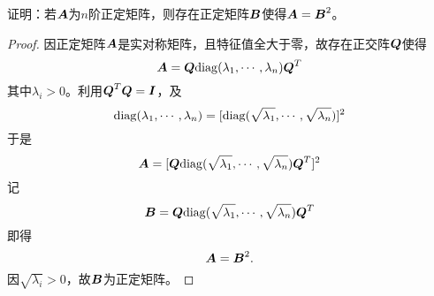\begin{frame}
  \begin{li}
    证明：若$\boldsymbol{A}$为$n$阶正定矩阵，则存在正定矩阵$\boldsymbol{B}$使得$\boldsymbol{A}=\boldsymbol{B}^2$。
  \end{li}

  \begin{proof}
    因正定矩阵$\boldsymbol{A}$是实对称矩阵，且特征值全大于零，故存在正交阵$\boldsymbol{Q}$使得
    $$
    \boldsymbol{A}=\boldsymbol{Q}\mathrm{diag}(\lambda_1,\cdots,\lambda_n)\boldsymbol{Q}^T
    $$
    其中$\lambda_i>0$。利用$\boldsymbol{Q}^T\boldsymbol{Q}=\boldsymbol{I}$，及
    $$
    \mathrm{diag}(\lambda_1,\cdots,\lambda_n)=[\mathrm{diag}(\sqrt{\lambda_1},\cdots,\sqrt{\lambda_n})]^2
    $$
    于是
    $$
    \boldsymbol{A}=[\boldsymbol{Q}\mathrm{diag}(\sqrt{\lambda_1},\cdots,\sqrt{\lambda_n})\boldsymbol{Q}^T]^2
    $$
    记
    $$
    \boldsymbol{B}=\boldsymbol{Q}\mathrm{diag}(\sqrt{\lambda_1},\cdots,\sqrt{\lambda_n})\boldsymbol{Q}^T
    $$
    即得
    $$
    \boldsymbol{A}=\boldsymbol{B}^2.
    $$\pause 
    因$\sqrt{\lambda_i}>0$，故$\boldsymbol{B}$为正定矩阵。
  \end{proof}
\end{frame}

